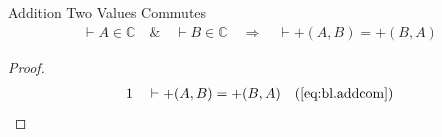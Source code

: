 \begin{lemma} Addition Two Values Commutes
\begin{align}
\vdash A \in \mathbb{C}\quad\&\quad \vdash B \in
    \mathbb{C}\quad\Rightarrow\quad \vdash +( A , B ) = +( B , A
    )\label{eq:bl.addcom2}\tag{bl.addcom2}
\end{align}
\end{lemma}

\begin{proof}
\begin{align}
  1 &&  & \vdash +( A , B ) = +( B , A )&(\mbox{\ref{eq:bl.addcom}})\notag
\end{align}
\end{proof}



